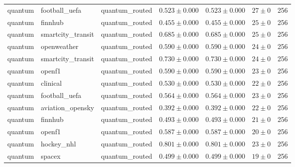 \begin{table}[htbp]
\begin{tabular}{l l l r r r r}
quantum & football\_uefa & quantum\_routed & $0.523\pm0.000$ & $0.523\pm0.000$ & $27\pm0$ & 256 \\
quantum & finnhub & quantum\_routed & $0.455\pm0.000$ & $0.455\pm0.000$ & $25\pm0$ & 256 \\
quantum & smartcity\_transit & quantum\_routed & $0.685\pm0.000$ & $0.685\pm0.000$ & $25\pm0$ & 256 \\
quantum & openweather & quantum\_routed & $0.590\pm0.000$ & $0.590\pm0.000$ & $24\pm0$ & 256 \\
quantum & smartcity\_transit & quantum\_routed & $0.730\pm0.000$ & $0.730\pm0.000$ & $24\pm0$ & 256 \\
quantum & openf1 & quantum\_routed & $0.590\pm0.000$ & $0.590\pm0.000$ & $23\pm0$ & 256 \\
quantum & clinical & quantum\_routed & $0.530\pm0.000$ & $0.530\pm0.000$ & $22\pm0$ & 256 \\
quantum & football\_uefa & quantum\_routed & $0.564\pm0.000$ & $0.564\pm0.000$ & $23\pm0$ & 256 \\
quantum & aviation\_opensky & quantum\_routed & $0.392\pm0.000$ & $0.392\pm0.000$ & $22\pm0$ & 256 \\
quantum & finnhub & quantum\_routed & $0.493\pm0.000$ & $0.493\pm0.000$ & $21\pm0$ & 256 \\
quantum & openf1 & quantum\_routed & $0.587\pm0.000$ & $0.587\pm0.000$ & $20\pm0$ & 256 \\
quantum & hockey\_nhl & quantum\_routed & $0.801\pm0.000$ & $0.801\pm0.000$ & $23\pm0$ & 256 \\
quantum & spacex & quantum\_routed & $0.499\pm0.000$ & $0.499\pm0.000$ & $19\pm0$ & 256 \\
\hline
\end{tabular}
\end{table}
